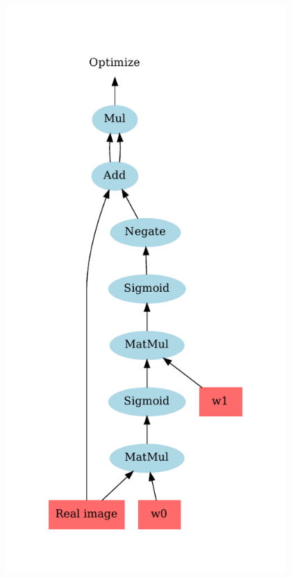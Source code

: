 \documentclass{beamer}
\begin{document}
\begin{frame}
\begin{columns}
\begin{column}{0.5\textwidth}
	\includegraphics[width=0.8\textwidth]{sq_diff_all.pdf}
\end{column}
\end{columns}
\end{frame}
\end{document}
